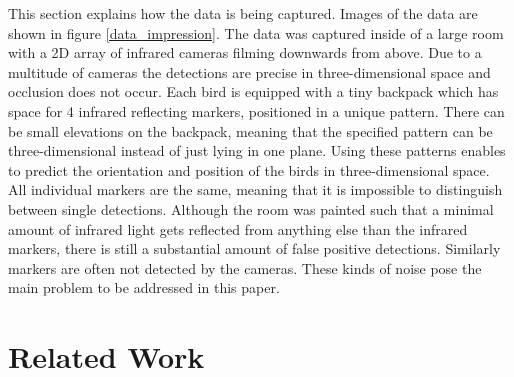 \documentclass{article}
\begin{document}

This section explains how the data is being captured. Images of the data are shown in figure \ref{data_impression}.
The data was captured inside of a large room with a 2D array of infrared cameras filming downwards from above. Due to a multitude of cameras the detections are precise in three-dimensional space and occlusion does not occur. Each bird is equipped with a tiny backpack which has space for 4 infrared reflecting markers, positioned in a unique pattern. There can be small elevations on the backpack, meaning that the specified pattern can be three-dimensional instead of just lying in one plane. Using these patterns enables to predict the orientation and position of the birds in three-dimensional space. All individual markers are the same, meaning that it is impossible to distinguish between single detections.  Although the room was painted such that a minimal amount of infrared light gets reflected from anything else than the infrared markers, there is still a substantial amount of false positive detections. Similarly markers are often not detected by the cameras. These kinds of noise pose the main problem to be addressed in this paper.   %







\section{Related Work}
\label{related_work}
\end{document}

